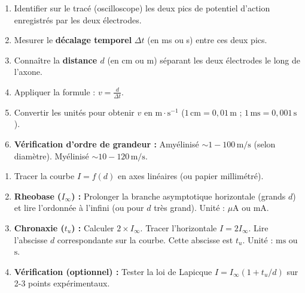 \documentclass[11pt]{article}
\begin{document}
\begin{methode}
\begin{enumerate}
\item Identifier sur le tracé (oscilloscope) les deux pics de potentiel d'action enregistrés par les deux électrodes.
\item Mesurer le \textbf{décalage temporel} $\Delta t$ (en ms ou s) entre ces deux pics.
\item Connaître la \textbf{distance $d$} (en cm ou m) séparant les deux électrodes le long de l'axone.
\item Appliquer la formule : $v = \frac{d}{\Delta t}$.
\item Convertir les unités pour obtenir $v$ en $\text{m}\cdot\text{s}^{-1}$ ($1\,\text{cm} = 0,01\,\text{m}$ ; $1\,\text{ms} = 0,001\,\text{s}$).
\item \textbf{Vérification d'ordre de grandeur :} Amyélinisé $\sim 1-100\,\text{m/s}$ (selon diamètre). Myélinisé $\sim 10-120\,\text{m/s}$.
\end{enumerate}
\end{methode}

\begin{methode}
\begin{enumerate}
\item Tracer la courbe $I = f(d)$ en axes linéaires (ou papier millimétré).
\item \textbf{Rheobase ($I_{\infty}$) :} Prolonger la branche asymptotique horizontale (grands $d$) et lire l'ordonnée à l'infini (ou pour $d$ très grand). Unité : $\mu\text{A}$ ou $\text{mA}$.
\item \textbf{Chronaxie ($t_u$) :} Calculer $2 \times I_{\infty}$. Tracer l'horizontale $I = 2 I_{\infty}$. Lire l'abscisse $d$ correspondante sur la courbe. Cette abscisse est $t_u$. Unité : $\text{ms}$ ou $\text{s}$.
\item \textbf{Vérification (optionnel) :} Tester la loi de Lapicque $I = I_{\infty}(1 + t_u/d)$ sur 2-3 points expérimentaux.
\end{enumerate}
\end{methode}
\end{document}
